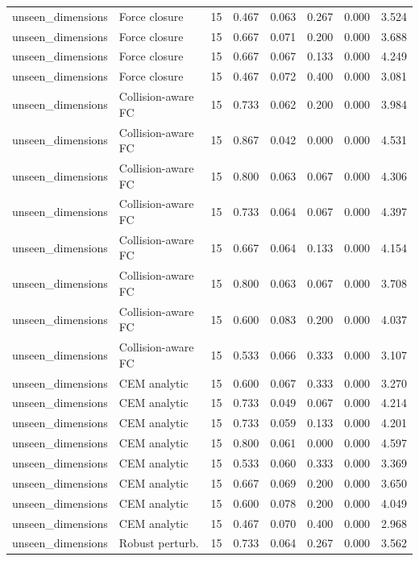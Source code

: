 {\begin{longtable}{llrrrrrr}
unseen\_dimensions & Force closure & 15 & 0.467 & 0.063 & 0.267 & 0.000 & 3.524 \\
unseen\_dimensions & Force closure & 15 & 0.667 & 0.071 & 0.200 & 0.000 & 3.688 \\
unseen\_dimensions & Force closure & 15 & 0.667 & 0.067 & 0.133 & 0.000 & 4.249 \\
unseen\_dimensions & Force closure & 15 & 0.467 & 0.072 & 0.400 & 0.000 & 3.081 \\
unseen\_dimensions & Collision-aware FC & 15 & 0.733 & 0.062 & 0.200 & 0.000 & 3.984 \\
unseen\_dimensions & Collision-aware FC & 15 & 0.867 & 0.042 & 0.000 & 0.000 & 4.531 \\
unseen\_dimensions & Collision-aware FC & 15 & 0.800 & 0.063 & 0.067 & 0.000 & 4.306 \\
unseen\_dimensions & Collision-aware FC & 15 & 0.733 & 0.064 & 0.067 & 0.000 & 4.397 \\
unseen\_dimensions & Collision-aware FC & 15 & 0.667 & 0.064 & 0.133 & 0.000 & 4.154 \\
unseen\_dimensions & Collision-aware FC & 15 & 0.800 & 0.063 & 0.067 & 0.000 & 3.708 \\
unseen\_dimensions & Collision-aware FC & 15 & 0.600 & 0.083 & 0.200 & 0.000 & 4.037 \\
unseen\_dimensions & Collision-aware FC & 15 & 0.533 & 0.066 & 0.333 & 0.000 & 3.107 \\
unseen\_dimensions & CEM analytic & 15 & 0.600 & 0.067 & 0.333 & 0.000 & 3.270 \\
unseen\_dimensions & CEM analytic & 15 & 0.733 & 0.049 & 0.067 & 0.000 & 4.214 \\
unseen\_dimensions & CEM analytic & 15 & 0.733 & 0.059 & 0.133 & 0.000 & 4.201 \\
unseen\_dimensions & CEM analytic & 15 & 0.800 & 0.061 & 0.000 & 0.000 & 4.597 \\
unseen\_dimensions & CEM analytic & 15 & 0.533 & 0.060 & 0.333 & 0.000 & 3.369 \\
unseen\_dimensions & CEM analytic & 15 & 0.667 & 0.069 & 0.200 & 0.000 & 3.650 \\
unseen\_dimensions & CEM analytic & 15 & 0.600 & 0.078 & 0.200 & 0.000 & 4.049 \\
unseen\_dimensions & CEM analytic & 15 & 0.467 & 0.070 & 0.400 & 0.000 & 2.968 \\
unseen\_dimensions & Robust perturb. & 15 & 0.733 & 0.064 & 0.267 & 0.000 & 3.562 \\

\end{longtable}}
